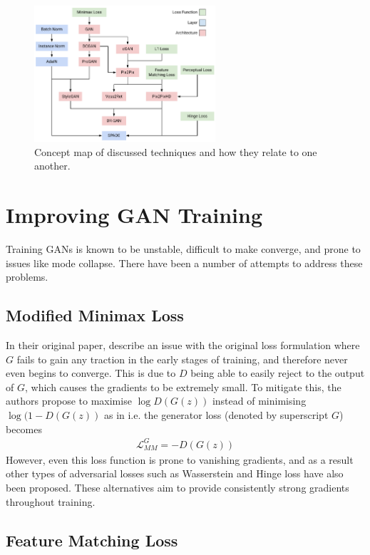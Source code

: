 \begin{figure}
    \centering
    \includegraphics[width=0.6\textwidth]{background/figs/concept-map.pdf}
    \caption{Concept map of discussed techniques and how they relate to one another.}
    \label{fig:conceptmap}
\end{figure}

\section{Improving GAN Training}

Training GANs is known to be unstable, difficult to make converge, and prone to issues like mode collapse.
There have been a number of attempts to address these problems. 

\subsection{Modified Minimax Loss}

In their original paper, \citeauthor{gan} describe an issue with the original loss formulation where $G$ fails to gain any traction in the early stages of training, and therefore never even begins to converge.
This is due to $D$ being able to easily reject to the output of $G$, which causes the gradients to be extremely small.
To mitigate this, the authors propose to maximise $\log D(G(z))$ instead of minimising $\log(1-D(G(z))$ as in  i.e. the generator loss (denoted by superscript $G$) becomes
\begin{align}
    \mathcal{L}_{MM}^G = - D(G(z))
\end{align}
However, even this loss function is prone to vanishing gradients, and as a result other types of adversarial losses such as Wasserstein and Hinge loss have also been proposed.
These alternatives aim to provide consistently strong gradients throughout training.

\subsection{Feature Matching Loss} \label{sec:featurematching}

